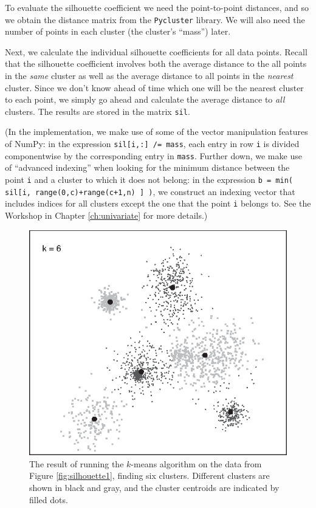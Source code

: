 To evaluate the silhouette coefficient we need the point-to-point
distances, and so we obtain the distance matrix from the 
\texttt{Pycluster} library. We will also need the number of points
in each cluster (the cluster's ``mass'') later. 

Next, we calculate the individual silhouette coefficients for all data
points. Recall that the silhouette coefficient involves both the
average distance to the all points in the \emph{same} cluster as well
as the average distance to all points in the \emph{nearest} cluster.
Since we don't know ahead of time which one will be the nearest
cluster to each point, we simply go ahead and calculate the average
distance to \emph{all} clusters. The results are stored in the matrix
\texttt{sil}.

(In the implementation, we make use of some of the vector manipulation
features of NumPy: in the expression \texttt{sil[i,:] /= mass}, each
entry in row \texttt{i} is divided componentwise by the corresponding
entry in \texttt{mass}. Further down, we make use of ``advanced
indexing'' when looking for the minimum distance between the point
\texttt{i} and a cluster to which it does not belong: in the
expression \texttt{b = min( sil[i, range(0,c)+range(c+1,n) ] )}, we
construct an indexing vector that includes indices for all clusters
except the one that the point \texttt{i} belongs to. See the Workshop
in Chapter \ref{ch:univariate} for more details.)

\begin{figure}
  \centerline{\includegraphics{img/clustershop3}}
  \caption{The result of running the $k$-means algorithm on the data
    from Figure \ref{fig:silhouette1}, finding six clusters.
    Different clusters are shown in black and gray, and the cluster
    centroids are indicated by filled dots.}
  \label{fig:clustershop3}
\end{figure}

